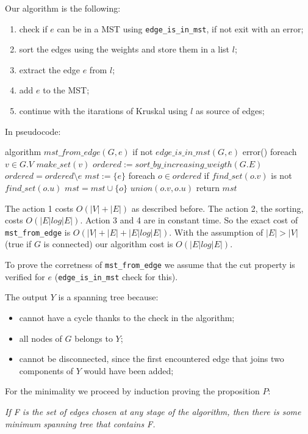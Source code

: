 \documentclass[paper=a4, fontsize=11pt]{scrartcl} %
\numberwithin{equation}{section} %
\numberwithin{figure}{section} %
\numberwithin{table}{section} %
\begin{document}
Our algorithm is the following:

\begin{enumerate}
    \item check if $e$ can be in a MST using \verb|edge_is_in_mst|, if not exit with an error;
    \item sort the edges using the weights and store them in a list $l$;
    \item extract the edge $e$ from $l$;
    \item add $e$ to the MST;
    \item continue with the itarations of Kruskal using $l$ as source of edges;
\end{enumerate}

In pseudocode:

\begin{pseudo}
algorithm $mst\_from\_edge(G, e)$
    if not $edge\_is\_in\_mst(G, e)$
        error()
    foreach $v \in G.V$
        $make\_set(v)$
    $ordered := sort\_by\_increasing\_weigth(G.E)$
    $ordered = ordered \setminus e$
    $mst := \{e\}$
    foreach $o \in ordered$
        if $find\_set(o.v)$ is not $find\_set(o.u)$
            $mst = mst \cup \{o\}$
            $union(o.v, o.u)$
    return $mst$
\end{pseudo}

The action 1 costs $O(|V|+|E|)$ as described before.
The action 2, the sorting, costs $O(|E|log|E|)$.
Action 3 and 4 are in constant time.
So the exact cost of \verb|mst_from_edge| is $O(|V|+|E| + |E|log|E|)$.
With the assumption of $|E| > |V|$ (true if $G$ is connected)  our algorithm cost is $O(|E|log|E|)$.

To prove the corretness of \verb|mst_from_edge| we assume that the cut property is verified for $e$ (\verb|edge_is_in_mst| check for this).

The output $Y$ is a spanning tree because:
\begin{itemize}
    \item cannot have a cycle thanks to the check in the algorithm;
    \item all nodes of $G$ belongs to $Y$;
    \item cannot be disconnected, since the first encountered edge that joins two components of $Y$ would have been added;
\end{itemize}

For the minimality we proceed by induction proving the proposition $P$:

\bigskip
{\em If F is the set of edges chosen at any stage of the algorithm, then there is some minimum spanning tree that contains F.}
\bigskip
\end{document}

